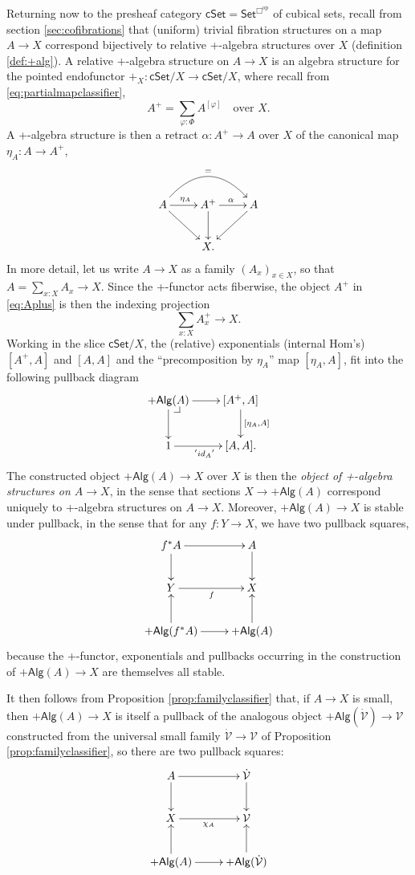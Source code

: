 \documentclass[11pt]{amsart}
\makeatletter
\newcommand{\psh}[1]{\ensuremath{\mathsf{Set}^{#1^{\mathrm{op}}}}}
\newcommand{\cSet}{\ensuremath{\mathsf{cSet}}}
\newcommand{\ra}{\ensuremath{\rightarrow}}
\newcommand{\V}{\ensuremath{\mathcal{V}}}
\newcommand{\VV}{\ensuremath{\dot{\mathcal{V}}}}
\theoremstyle{remark}
\theoremstyle{definition}
\newcommand{\pbcorner}[1][dr]{\save*!/#1-1.2pc/#1:(-1,1)@^{|-}\restore}
\makeatother
\begin{document}
Returning now to the presheaf category $\cSet = \psh{\Box}$ of cubical sets, recall from section \ref{sec:cofibrations} that (uniform) trivial fibration structures on a map $A\ra X$ correspond bijectively to relative +-algebra structures over $X$ (definition \ref{def:+alg}).  A relative $+$-algebra structure on $A \ra X$ is an algebra structure for the pointed endofunctor $+_X : \cSet/X \ra \cSet/X$, where recall from \eqref{eq:partialmapclassifier}, 
\[
A^+ = \sum_{\varphi:\Phi}A^{[\varphi]}\quad\text{over $X$}.
\]
A +-algebra structure is then a retract $\alpha : A^+\ra A$ over $X$ of the canonical map $\eta_A : A\ra A^+$,
\begin{equation}\label{eq:Aplus}
\xymatrix{
A\ar[rd] \ar[r]^{\eta_A} \ar@/^6ex/ [rr]^= & A^+ \ar[r]^{\alpha} \ar[d]& \ar[ld]A \\
& X. &
}
\end{equation}
In more detail, let us write $A\ra X$ as a family $(A_x)_{x\in X}$, so that $A=\sum_{x:X}A_x \ra X$. Since the +-functor acts fiberwise, the object $A^+$ in \eqref{eq:Aplus} is then the indexing projection
\[
\sum_{x:X}A^+_x \ra X.
\]
Working in the slice  $\cSet/X$, the (relative) exponentials (internal Hom's) $[A^+, A]$ and $[A, A]$ and the ``precomposition by $\eta_A$'' map $[\eta_A, A]$,  fit into the following pullback diagram 
\begin{equation}\label{diag:plualgstru}
\xymatrix{
+\mathsf{Alg}(A)\ar[d] \ar[r] \pbcorner & [A^+, A] \ar[d]^{[\eta_A, A]}\\
1 \ar[r]_{'{id_A}'} & [A, A].
}
\end{equation}
The constructed object $+\mathsf{Alg}(A) \ra X$ over $X$ is then the \emph{object of +-algebra structures on $A\ra X$}, in the sense that sections $X \ra +\mathsf{Alg}(A)$ correspond uniquely to +-algebra structures on $A\ra X$. Moreover, $+\mathsf{Alg}(A) \ra X$ is stable under pullback, in the sense that for any $f:Y\ra X$, we have two pullback squares,
\begin{equation}\label{diagram:pbplus}
\xymatrix{
f^*A \ar[d] \ar[r]  & A \ar[d]\\
Y \ar[r]_{f} &X\\
+\mathsf{Alg}(f^*A)\ar[u] \ar[r] & +\mathsf{Alg}(A)\ar[u].
}
\end{equation}
because the +-functor, exponentials and pullbacks occurring in the construction of $+\mathsf{Alg}(A) \ra X$ are themselves all stable. 

It then follows from Proposition \ref{prop:familyclassifier} that, if $A\ra X$ is small, then $+\mathsf{Alg}(A) \ra X$ is itself a pullback of the analogous object $+\mathsf{Alg}(\VV) \ra \V$ constructed from the universal small family $\VV\ra\V$ of Proposition \ref{prop:familyclassifier}, so there are two pullback squares:
\begin{equation}\label{diagram:tfib1}
\xymatrix{
A \ar[d] \ar[r]  & \VV \ar[d]\\
X \ar[r]_{\chi_A} & \V\\
+\mathsf{Alg}(A)\ar[u] \ar[r] & +\mathsf{Alg}(\VV)\ar[u].
}
\end{equation}
\end{document}
